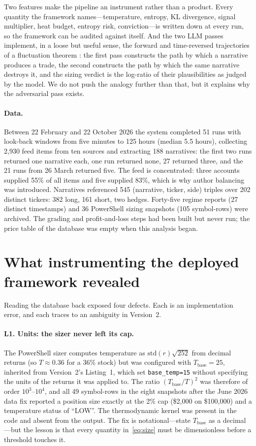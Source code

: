 \documentclass[11pt]{article}
\newcommand{\Tb}{T_{\mathrm{base}}}
\begin{document}
Two features make the pipeline an instrument rather than a product. Every quantity the framework names---temperature, entropy, KL divergence, signal multiplier, heat budget, entropy risk, conviction---is written down at every run, so the framework can be audited against itself. And the two LLM passes implement, in a loose but useful sense, the forward and time-reversed trajectories of a fluctuation theorem \citep{stratonovich1992,searles1999,evans2002}: the first pass constructs the path by which a narrative produces a trade, the second constructs the path by which the same narrative destroys it, and the sizing verdict is the log-ratio of their plausibilities as judged by the model. We do not push the analogy further than that, but it explains why the adversarial pass exists.

\paragraph{Data.} Between 22 February and 22 October 2026 the system completed 51 runs with look-back windows from five minutes to 125 hours (median 5.5 hours), collecting 2,930 feed items from ten sources and extracting 188 narratives: the first two runs returned one narrative each, one run returned none, 27 returned three, and the 21 runs from 26 March returned five. The feed is concentrated: three accounts supplied 55\% of all items and five supplied 83\%, which is why author balancing was introduced. Narratives referenced 545 (narrative, ticker, side) triples over 202 distinct tickers: 382 long, 161 short, two hedges. Forty-five regime reports (27 distinct timestamps) and 36 PowerShell sizing snapshots (105 symbol-rows) were archived. The grading and profit-and-loss steps had been built but never run; the price table of the database was empty when this analysis began.

\section{What instrumenting the deployed framework revealed}\label{sec:lessons}
Reading the database back exposed four defects. Each is an implementation error, and each traces to an ambiguity in Version~2.

\paragraph{L1. Units: the sizer never left its cap.}
The PowerShell sizer computes temperature as $\mathrm{std}(r)\sqrt{252}$ from decimal returns (so $T\approx0.36$ for a 36\% stock) but was configured with $\Tb=25$, inherited from Version~2's Listing~1, which set \texttt{base\_temp=15} without specifying the units of the returns it was applied to. The ratio $(\Tb/T)^2$ was therefore of order $10^3$--$10^4$, and all 49 symbol-rows in the eight snapshots after the June 2026 data fix reported a position size exactly at the 2\% cap (\$2,000 on \$100,000) and a temperature status of ``LOW''. The thermodynamic kernel was present in the code and absent from the output. The fix is notational---state $\Tb$ as a decimal---but the lesson is that every quantity in~\eqref{eq:size} must be dimensionless before a threshold touches it.
\end{document}
